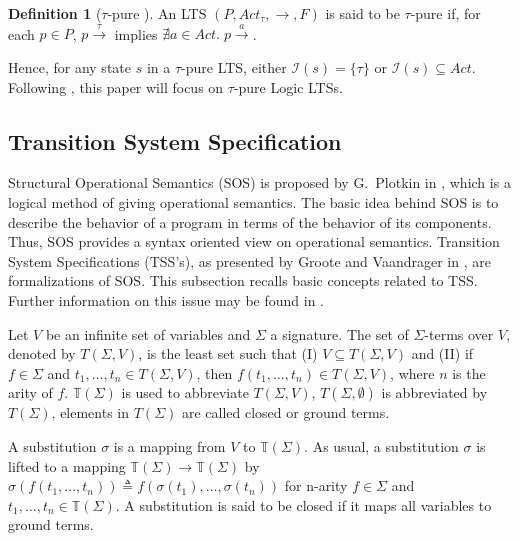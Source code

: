 \documentclass{elsarticle}
\theoremstyle{plain}
\theoremstyle{definition}
\newtheorem{mydefn}[theorem]{Definition}
\begin{document}
\begin{mydefn}[$\tau$-pure  \cite{Luttgen10}]
An LTS $(P,Act_{\tau},\longrightarrow,F)$ is said to be {$\tau$}-pure if, for each $p \in P$, $p\stackrel{\tau}{\longrightarrow}$ implies $\nexists a\in Act.\;p\stackrel{a}{\longrightarrow}$.
\end{mydefn}

Hence, for any state $s$ in a $\tau$-pure LTS, either ${\mathcal I}(s)=\{\tau\}$ or ${\mathcal I}(s)\subseteq Act$.
Following \cite{Luttgen10}, this paper will focus on $\tau$-pure Logic LTSs.


\subsection{Transition System Specification}
Structural Operational Semantics (SOS) is proposed by G.~Plotkin in \cite{Plotkin81}, which is a logical method of giving operational semantics.
The basic idea behind SOS is to describe the behavior of a program in terms of the behavior of its components.
Thus, SOS provides a syntax oriented view on operational semantics.
Transition System Specifications (TSS's), as presented by Groote and Vaandrager in \cite{Groote92}, are formalizations of SOS.
This subsection recalls basic concepts related to TSS.
Further information on this issue may be found in \cite{Aceto01,Bol96,Groote92}.

 Let $V$ be an infinite set of variables and $\Sigma$  a signature. The set of $\Sigma $-terms over $V$, denoted by $T(\Sigma ,V)$, is the least set such that (I) $V \subseteq T(\Sigma ,V)$ and (II) if $f\in \Sigma$ and $t_1,\dots,t_n \in T(\Sigma ,V)$, then $f(t_1,\dots,t_n) \in T(\Sigma,V)$, where $n$ is the arity of $f$. $\mathbb{T} (\Sigma )$ is used to abbreviate $T(\Sigma ,V)$, $T(\Sigma ,\emptyset )$ is abbreviated by $T(\Sigma )$, elements in $T(\Sigma )$ are called closed or ground terms.

    A substitution $\sigma $ is a mapping from $V$ to $\mathbb{T}(\Sigma )$.  As usual, a substitution $\sigma $ is lifted to a mapping $\mathbb{T} (\Sigma ) \rightarrow \mathbb{T} (\Sigma )$ by $\sigma (f(t_1,...,t_n))\triangleq f(\sigma(t_1),\dots ,\sigma (t_n))$ for n-arity $f\in \Sigma$ and $t_1,\dots ,t_n \in {\mathbb T}(\Sigma )$. A substitution is said to be closed if it maps all variables to ground terms.
\end{document}
